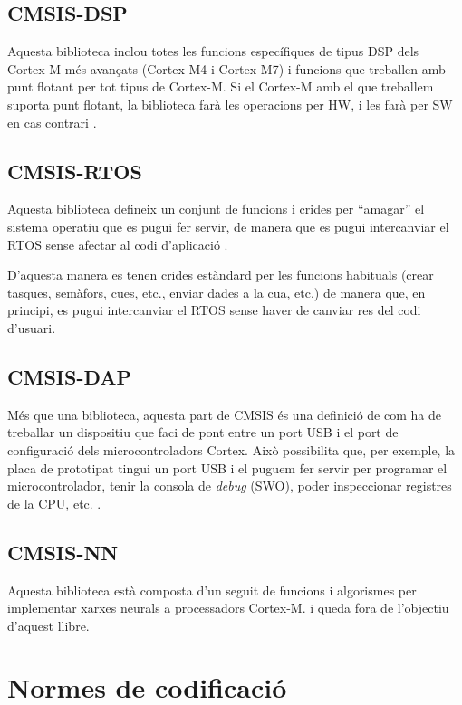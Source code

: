 \section{CMSIS-DSP}
\label{sec:CMSIS-DSP}
Aquesta biblioteca inclou totes les funcions específiques de tipus \gls{DSP} dels Cortex-M més avançats (Cortex-M4 i Cortex-M7) i funcions que treballen amb punt flotant per tot tipus de Cortex-M. Si el Cortex-M amb el que treballem suporta punt flotant, la biblioteca farà les operacions per HW, i les farà per SW en cas contrari \cite{CMSIS-DSP}\cite{AN0051}.

\section{CMSIS-RTOS}
\label{sec:CMSIS-RTOS}
Aquesta biblioteca defineix un conjunt de funcions i crides per ``amagar'' el sistema operatiu que es pugui fer servir, de manera que es pugui intercanviar el \gls{RTOS} sense afectar al codi d'aplicació \cite{CMSIS-RTOS}.

D'aquesta manera es tenen crides estàndard per les funcions habituals (crear tasques, semàfors, cues, etc., enviar dades a la cua, etc.) de manera que, en principi, es pugui intercanviar el RTOS sense haver de canviar res del codi d'usuari.

\section{CMSIS-DAP}
\label{sec:CMSIS-DAP}
Més que una biblioteca, aquesta part de CMSIS és una definició de com ha de treballar un dispositiu que faci de pont entre un port USB i el port de configuració dels microcontroladors Cortex. Això possibilita que, per exemple, la placa de prototipat tingui un port USB i el puguem fer servir per programar el microcontrolador, tenir la consola de {\em debug} (SWO), poder inspeccionar registres de la CPU, etc. \cite{CMSIS-DAP}.

\section{CMSIS-NN}
\label{sec:CMSIS-NN}
Aquesta biblioteca està composta d'un seguit de funcions i algorismes per implementar xarxes neurals a processadors Cortex-M. \cite{CMSIS_NN_paper}\cite{CMSIS-NN} i queda fora de l'objectiu d'aquest llibre.

\chapter{Normes de codificació}
\label{sec:GuiesProgramacio}

